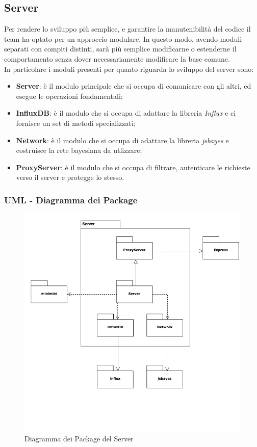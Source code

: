 \subsection{Server}\label{archServer}
Per rendere lo sviluppo più semplice, e garantire la manutenibilità del codice il team ha optato per un approccio modulare. In questo modo, avendo moduli separati con compiti distinti, sarà più semplice modificarne o estenderne il comportamento senza dover necessariamente modificare la base comune.\\
In particolare i moduli presenti per quanto riguarda lo sviluppo del server sono:
\begin{itemize}
	\item \textbf{Server}: è il modulo principale che si occupa di comunicare con gli altri, ed esegue le operazioni fondamentali;
	\item \textbf{InfluxDB}: è il modulo che si occupa di adattare la libreria \textit{Influx} e ci fornisce un set di metodi specializzati;
	\item \textbf{Network}: è il modulo che si occupa di adattare la libreria \textit{jsbayes} e costruisce la rete bayesiana da utlizzare;
	\item \textbf{ProxyServer}: è il modulo che si occupa di filtrare, autenticare le richieste verso il server e  protegge lo stesso.
\end{itemize}


\subsubsection{UML - Diagramma dei Package}
\begin{figure}[H]
	\begin{center}
		\includegraphics[scale=0.6]{./images/serverPackage.png} 
	\end{center}
	\caption{Diagramma dei Package del Server}
\end{figure}

